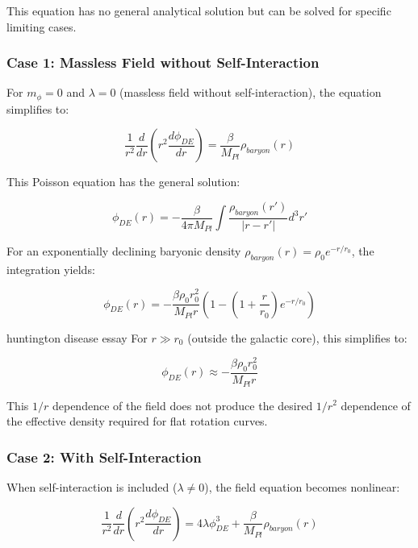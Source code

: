 \documentclass[a4paper,12pt]{article}
\begin{document}
	This equation has no general analytical solution but can be solved for specific limiting cases.
	
	\subsubsection{Case 1: Massless Field without Self-Interaction}
	
	For $m_{\phi} = 0$ and $\lambda = 0$ (massless field without self-interaction), the equation simplifies to:
	
	\begin{equation}
		\frac{1}{r^2}\frac{d}{dr}\left(r^2\frac{d\phi_{DE}}{dr}\right) = \frac{\beta}{M_{Pl}}\rho_{baryon}(r)
	\end{equation}
	
	This Poisson equation has the general solution:
	
	\begin{equation}
		\phi_{DE}(r) = -\frac{\beta}{4\pi M_{Pl}} \int \frac{\rho_{baryon}(r')}{|r-r'|} d^3r'
	\end{equation}
	
	For an exponentially declining baryonic density $\rho_{baryon}(r) = \rho_0 e^{-r/r_0}$, the integration yields:
	
	\begin{equation}
		\phi_{DE}(r) = -\frac{\beta\rho_0 r_0^2}{M_{Pl}r}(1 - (1 + \frac{r}{r_0})e^{-r/r_0})
	\end{equation}
	
	huntington disease essay For $r \gg r_0$ (outside the galactic core), this simplifies to:
	
	\begin{equation}
		\phi_{DE}(r) \approx -\frac{\beta\rho_0 r_0^2}{M_{Pl}r}
	\end{equation}
	
	This $1/r$ dependence of the field does not produce the desired $1/r^2$ dependence of the effective density required for flat rotation curves.
	
	\subsubsection{Case 2: With Self-Interaction}
	
	When self-interaction is included ($\lambda \neq 0$), the field equation becomes nonlinear:
	
	\begin{equation}
		\frac{1}{r^2}\frac{d}{dr}\left(r^2\frac{d\phi_{DE}}{dr}\right) = 4\lambda\phi_{DE}^3 + \frac{\beta}{M_{Pl}}\rho_{baryon}(r)
	\end{equation}
	
\end{document}
